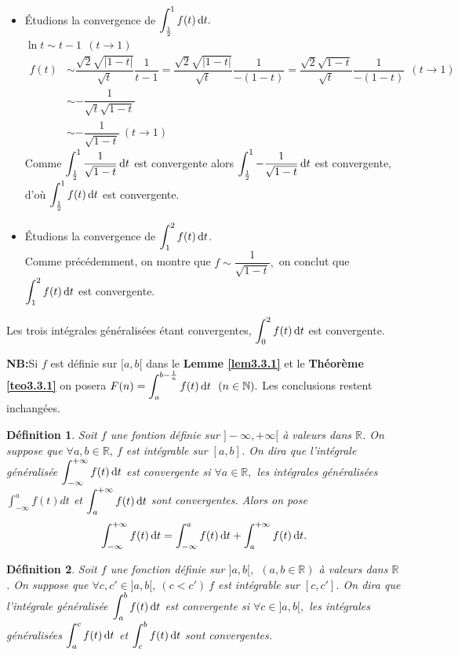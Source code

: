 \documentclass[11pt, a4paper]{book}
\newtheorem{defi}{D\'efinition}[section]
\begin{document}
\begin{enumerate}
\begin{itemize}
\item \'Etudions la convergence de ${\displaystyle \int_\frac{1}{2}^1f(t)\,\mathrm{d} t.}$\\
$\ln t \sim t-1~~(t\longrightarrow1)$\\
\begin{align*} f(t)&\sim \dfrac{\sqrt{2}\sqrt{|1-t|}}{\sqrt{t}}\dfrac{1}{t-1}=\dfrac{\sqrt{2}\sqrt{|1-t|}}{\sqrt{t}}\dfrac{1}{-(1-t)}=\dfrac{\sqrt{2}\sqrt{1-t}}{\sqrt{t}}\dfrac{1}{-(1-t)}~~(t\longrightarrow 1)\\ &\sim -\dfrac{1}{\sqrt{t}\sqrt{1-t}}\\& \sim -\dfrac{1}{\sqrt{1-t}}~(t\longrightarrow 1) \end{align*}
Comme ${\displaystyle \int_\frac{1}{2}^1\dfrac{1}{\sqrt{1-t}}\,\mathrm{d} t}$ est convergente alors ${\displaystyle \int_\frac{1}{2}^1-\dfrac{1}{\sqrt{1-t}}\,\mathrm{d} t}$ est convergente, d'o\`u ${\displaystyle \int_\frac{1}{2}^1 f(t)\,\mathrm{d} t}$ est convergente.
\item \'Etudions  la convergence de ${\displaystyle \int_1^2f(t)\,\mathrm{d} t}$.\\
Comme pr\'ec\'edemment, on montre que $f\sim \dfrac{1}{\sqrt{1-t}},$ on conclut que ${\displaystyle \int_1^2f(t)\,\mathrm{d} t}$ est convergente.
\end{itemize}
Les trois int\'egrales g\'en\'eralis\'ees \'etant convergentes, ${\displaystyle \int_0^2f(t)\,\mathrm{d} t}$ est convergente.\\
\end{enumerate}

\textbf{NB:}\quad Si $f$ est d\'efinie sur $[a,b[$ dans le \textbf{Lemme \ref{lem3.3.1}} et le \textbf{Th\'eor\`eme \ref{teo3.3.1}} on posera ${\displaystyle F(n)=\int_a^{b-\frac{1}{n}}f(t)\,\mathrm{d} t~~(n\in \mathbb{N})}.$ Les conclusions restent inchang\'ees.
\begin{defi} Soit $f$ une fontion d\'efinie sur $]-\infty,+\infty[$ \`a valeurs dans $\mathbb{R}$. On suppose que $\forall a,b\in \mathbb{R},~ f$ est int\'egrable sur $[a,b]$. On dira que l'int\'egrale g\'en\'eralis\'ee ${\displaystyle \int_{-\infty}^{+\infty}f(t)\,\mathrm{d} t}$ est convergente si $\forall a \in \mathbb{R},$ les int\'egrales g\'en\'eralis\'ees ${\displaystyle \int_{-\infty}^af(t)dt}$ et ${\displaystyle \int_a^{+\infty}f(t)\,\mathrm{d} t}$ sont convergentes. Alors on pose $$ \int_{-\infty}^{+\infty}f(t)\,\mathrm{d} t=\int_{-\infty}^af(t)\,\mathrm{d} t+\int_a^{+\infty}f(t)\,\mathrm{d} t.$$ \end{defi}
\begin{defi} Soit $f$ une fonction d\'efinie sur $]a,b[,~~(a,b\in \mathbb{R})$ \`a valeurs dans $\mathbb{R}$. On suppose que $ \forall c,c' \in ]a,b[, ~(c<c')~f$ est int\'egrable sur $[c,c']$. On dira que l'int\'egrale g\'en\'eralis\'ee ${\displaystyle \int_a^bf(t)\,\mathrm{d} t }$ est convergente si $ \forall c\in ]a,b[,$ les int\'egrales g\'en\'eralis\'ees ${\displaystyle \int_a^cf(t)\,\mathrm{d} t }$ et ${\displaystyle \int_c^bf(t)\,\mathrm{d} t }$ sont convergentes. 
\end{defi}
 
\end{document}
